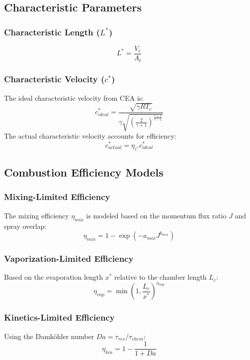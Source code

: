 \subsection{Characteristic Parameters}

\subsubsection{Characteristic Length ($L^*$)}
\begin{equation}
L^* = \frac{V_c}{A_t}
\end{equation}

\subsubsection{Characteristic Velocity ($c^*$)}
The ideal characteristic velocity from CEA is:
\begin{equation}
c^*_{ideal} = \frac{\sqrt{\gamma R T_c}}{\gamma \sqrt{\left(\frac{2}{\gamma+1}\right)^{\frac{\gamma+1}{\gamma-1}}}}
\end{equation}
The actual characteristic velocity accounts for efficiency:
\begin{equation}
c^*_{actual} = \eta_{c^*} c^*_{ideal}
\end{equation}

\subsection{Combustion Efficiency Models}

\subsubsection{Mixing-Limited Efficiency}
The mixing efficiency $\eta_{mix}$ is modeled based on the momentum flux ratio $J$ and spray overlap:
\begin{equation}
\eta_{mix} = 1 - \exp(-a_{mix} J^{b_{mix}})
\end{equation}

\subsubsection{Vaporization-Limited Efficiency}
Based on the evaporation length $x^*$ relative to the chamber length $L_c$:
\begin{equation}
\eta_{vap} = \min\left(1, \frac{L_c}{x^*}\right)^{a_{vap}}
\end{equation}

\subsubsection{Kinetics-Limited Efficiency}
Using the Damköhler number $Da = \tau_{res} / \tau_{chem}$:
\begin{equation}
\eta_{kin} = 1 - \frac{1}{1 + Da}
\end{equation}

